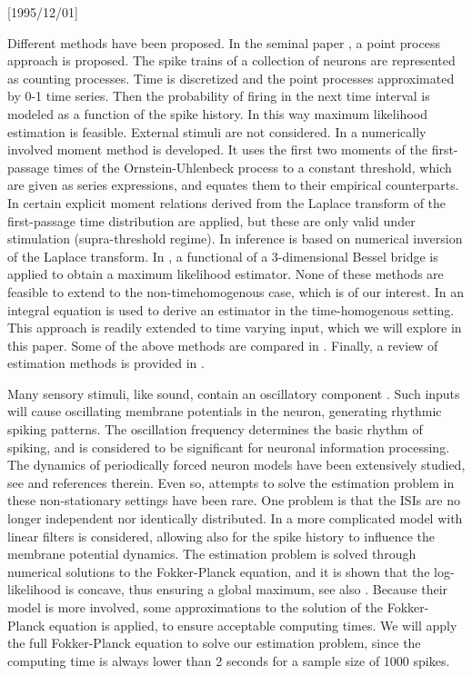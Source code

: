 \NeedsTeXFormat{LaTeX2e}[1995/12/01] \documentclass[10pt]{bmc_article}
\newenvironment{bmcformat}{\begin{raggedright}\baselineskip20pt\sloppy\setboolean{publ}{false}}{\end{raggedright}\baselineskip20pt\sloppy}
\begin{document}
\begin{bmcformat}
Different methods have been
proposed. In the seminal paper \cite{Brillinger1988}, a point process approach
is proposed. The spike trains of a collection of neurons are 
represented as counting processes. Time is discretized and the point processes
approximated by 0-1 time series. Then the probability of firing in the
next time interval is modeled as a function of the
spike history. In this way maximum likelihood
estimation is feasible. External stimuli are not considered. 
In \cite{Inoue1995} a numerically involved moment method is
developed. It uses the first two moments of the first-passage times of
the Ornstein-Uhlenbeck process to a constant threshold, which are
given as series expressions, and equates them to their empirical
counterparts. In
\cite{DitlevsenLansky2005,DitlevsenLansky2006} certain explicit 
moment relations derived from the Laplace transform of the first-passage time
distribution are applied, but these are only valid under 
stimulation (supra-threshold regime). In \cite{Mullowney2008} inference is based on
numerical inversion of the Laplace transform. In \cite{Zhangetal2009}, a
functional of a 3-dimensional Bessel bridge is applied to obtain a maximum
likelihood estimator. None of these methods
are feasible to extend to the
non-timehomogenous case, which is of our interest. In \cite{Ditlevsen2008,Ditlevsen2007} an
integral equation is used to derive an estimator in the
time-homogenous setting. This approach is readily extended to time
varying input, which we will explore in this paper. Some of the above methods are compared in
\cite{Ditlevsen2008a}. Finally, a review of estimation methods is provided in
\cite{Lansky2008}. 

Many sensory stimuli, like sound, contain an oscillatory component
\cite{Braunetal1994,Chacron2000}. Such inputs will cause oscillating membrane
potentials in the neuron, generating rhythmic spiking patterns. The oscillation
frequency determines the basic rhythm of spiking, and is considered to be
significant for neuronal information processing. The dynamics of periodically
forced neuron models have been extensively studied, see
\cite{Bulsaraetal1996,Burkitt2006b,Lansky1997,Longtingetal1994,SacerdoteGiraudo2013,Shimokawa2000}
and references therein. Even so, attempts to solve the estimation problem in
these non-stationary settings have been rare. One problem is that the ISIs are
no longer independent nor identically distributed. In
\cite{Paninski2004} a more complicated model with linear filters is considered, allowing
also for the spike history to influence the membrane potential
dynamics. The estimation problem is solved through numerical solutions to the
Fokker-Planck equation, and it is shown that the log-likelihood is
concave, thus ensuring a global maximum, see also
\cite{Dong2011,Sirovich2011a}. Because their model is more involved,
some approximations to the solution of the Fokker-Planck equation is
applied, to ensure acceptable computing times. We will apply the full 
Fokker-Planck equation to solve our estimation problem, since the
computing time is always lower than 2 seconds for a sample size of
1000 spikes.   
  


\end{bmcformat}
\end{document}
